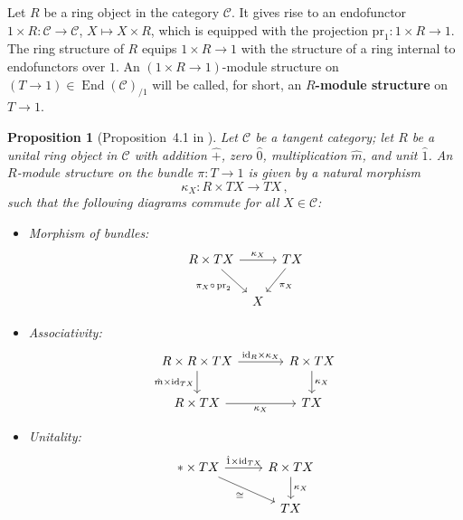\documentclass[12pt,reqno, a4paper]{amsart}
\numberwithin{equation}{section}
\theoremstyle{plain}
\newtheorem{Proposition}[Theorem]{Proposition}
\theoremstyle{definition}
\theoremstyle{remark}
\DeclareMathOperator{\End}{End}
\newcommand{\calC}{\mathcal{C}}
\newcommand{\id}{\mathrm{id}}
\newcommand{\Id}{\mathrm{1}}
\newcommand{\pr}{\mathrm{pr}}
\newcommand{\Rmult}{\hat{m}}
\newcommand{\Radd}{\hat{+}}
\newcommand{\Runit}{\hat{1}}
\newcommand{\Rzero}{\hat{0}}
\begin{document}
Let $R$ be a ring object in the category $\calC$. It gives rise to an endofunctor $\Id \times R: \calC \to \calC$, $X \mapsto X \times R$, which is equipped with the projection $\pr_1: \Id \times R \to \Id$. The ring structure of $R$ equips $\Id \times R \to \Id$ with the structure of a ring internal to endofunctors over $\Id$. An $(\Id \times R \to \Id)$-module structure on $(T \to \Id) \in \End(\calC)_{/\Id}$ will be called, for short, an \textbf{$R$-module structure} on $T \to \Id$.

\begin{Proposition}[Proposition~4.1 in \cite{AintablianBlohmann:2026}]
\label{prop:RModuleBundle}
Let $\calC$ be a tangent category; let $R$ be a unital ring object in $\calC$ with addition $\Radd$, zero $\Rzero$, multiplication $\Rmult$, and unit $\Runit$. An $R$-module structure on the bundle $\pi:T \to \Id$ is given by a natural morphism
\begin{equation*}
  \kappa_X: R \times TX
  \longrightarrow TX
  \,,
\end{equation*}
such that the following diagrams commute for all $X \in \calC$:
\begin{itemize}

\item[(i)] Morphism of bundles:
\begin{equation*}
\begin{tikzcd}[column sep={tiny}]
R \times TX \ar[rr, "\kappa_X"] \ar[dr, "\pi_X \circ \, \pr_2"'] &&
TX \ar[dl, "\pi_X"]
\\
& X &
\end{tikzcd}
\end{equation*}

\item[(ii)] Associativity:
\begin{equation*}
\begin{tikzcd}[column sep={large}]
R \times R \times TX \ar[r, "\id_R \times \kappa_X"]
\ar[d, "\Rmult \times \id_{TX}"'] &
R \times TX \ar[d, "\kappa_X"]
\\
R \times TX \ar[r, "\kappa_X"'] & TX
\end{tikzcd}
\end{equation*}

\item[(iii)] Unitality:
\begin{equation*}
\begin{tikzcd}[column sep=3em]
* \times TX \ar[r, "\Runit \times \id_{TX}"] \ar[dr, "\cong"'] &
R \times TX \ar[d, "\kappa_X"]
\\
& TX
\end{tikzcd}
\end{equation*}


\end{itemize}
\end{Proposition}
\end{document}

